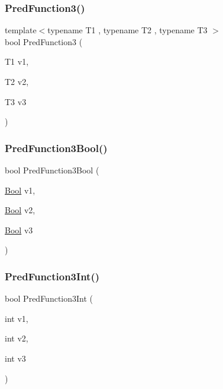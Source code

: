 \subsubsection{\texorpdfstring{PredFunction3()}{PredFunction3()}}
{\footnotesize\ttfamily template$<$typename T1 , typename T2 , typename T3 $>$ \\
bool Pred\+Function3 (\begin{DoxyParamCaption}\item[{T1}]{v1,  }\item[{T2}]{v2,  }\item[{T3}]{v3 }\end{DoxyParamCaption})}

\mbox{\label{_obj__test_2lib_2googletest-release-1_88_81_2googletest_2test_2gtest__pred__impl__unittest_8cc_afa4ce2143c2ffedb2fa5d5f8cff6f6e6}} 
\subsubsection{\texorpdfstring{PredFunction3Bool()}{PredFunction3Bool()}}
{\footnotesize\ttfamily bool Pred\+Function3\+Bool (\begin{DoxyParamCaption}\item[{\mbox{\hyperlink{struct_bool}{Bool}}}]{v1,  }\item[{\mbox{\hyperlink{struct_bool}{Bool}}}]{v2,  }\item[{\mbox{\hyperlink{struct_bool}{Bool}}}]{v3 }\end{DoxyParamCaption})}

\mbox{\label{_obj__test_2lib_2googletest-release-1_88_81_2googletest_2test_2gtest__pred__impl__unittest_8cc_a31b4c93e469feb1523b6073634c1ca4c}} 
\subsubsection{\texorpdfstring{PredFunction3Int()}{PredFunction3Int()}}
{\footnotesize\ttfamily bool Pred\+Function3\+Int (\begin{DoxyParamCaption}\item[{int}]{v1,  }\item[{int}]{v2,  }\item[{int}]{v3 }\end{DoxyParamCaption})}

